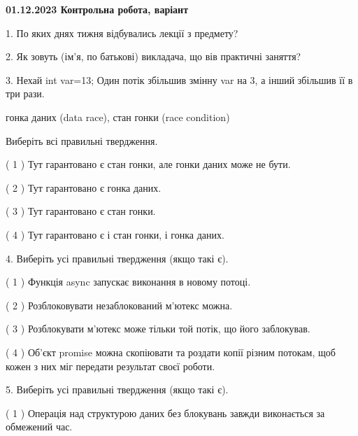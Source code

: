 \documentclass[12pt, ukrainian]{article}
\begin{document}
\vspace{4mm}
\newpage
\begin {large}

\textbf{01.12.2023 Контрольна робота, варіант  }\par


{
1. По яких днях тижня відбувались лекції з предмету?



\vspace{5mm}
2. Як зовуть (ім'я, по батькові) викладача, що вів практичні заняття?



\vspace{5mm}
3. Нехай int var=13; Один потік збільшив змінну var на 3, а інший збільшив її в три рази.

гонка даних (data race), стан гонки (race condition)

Виберіть всі правильні твердження.\par
\vspace{2mm}
( 1 ) Тут гарантовано є стан гонки, але гонки даних може не бути.%

( 2 ) Тут гарантовано є гонка даних.%

( 3 ) Тут гарантовано є стан гонки.%

( 4 ) Тут гарантовано є і стан гонки, і гонка даних.%


\vspace{5mm}
4. Виберіть усі правильні твердження (якщо такі є).\par
\vspace{2mm}

( 1 ) Функція async запускає виконання в новому потоці.%

( 2 ) Розблоковувати незаблокований м’ютекс можна.%

( 3 ) Розблокувати м’ютекс може тільки той потік, що його заблокував.%

( 4 ) Об’єкт promise можна скопіювати та роздати копії різним потокам, щоб кожен з них міг передати результат своєї роботи.%


\vspace{5mm}
5. Виберіть усі правильні твердження (якщо такі є).\par
\vspace{2mm}

( 1 ) Операція над структурою даних без блокувань завжди виконається за обмежений час.%

}
\end{large}
\end{document}
